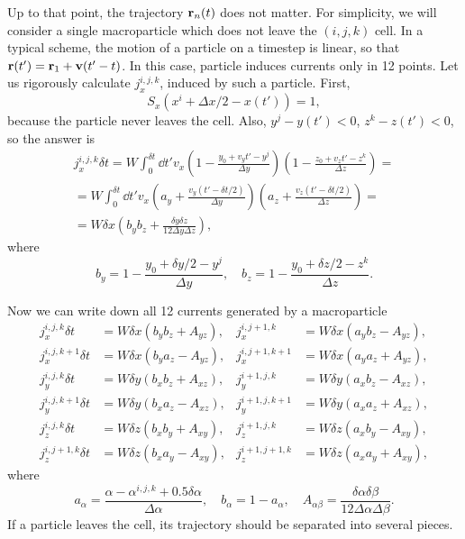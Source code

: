 \documentclass[12pt,a4paper,DIV=calc]{scrartcl}
\begin{document}
Up to that point, the trajectory $\vb{r}_n(t)$ does not matter.
For simplicity, we will consider a single macroparticle which does not leave the $(i,j,k)$ cell.
In a typical scheme, the motion of a particle on a timestep is linear, so that $\vb{r}(t') = \vb{r}_1 + \vb{v} (t'-t)$.
In this case, particle induces currents only in 12 points.
Let us rigorously calculate $j_x^{i,j,k}$, induced by such a particle.
First, 
\begin{equation}
    S_x(x^i + \Delta x/2 - x(t')) = 1,
\end{equation}
because the particle never leaves the cell.
Also, $y^j - y(t') < 0$, $z^k - z(t') < 0$, so the answer is
\begin{multline}
    j_x^{i,j,k} \delta t = W \int_0^{\delta t} \dd{t'} v_x \left(1 - \frac{y_0+v_y t' - y^j}{\Delta y}\right)\left(1 - \frac{z_0+v_z t' - z^k}{\Delta z}\right) = \\
    = W \int_0^{\delta t}\dd{t'} v_x \left(a_y + \frac{v_y (t'-\delta t/2)}{\Delta y}\right)\left(a_z + \frac{v_z (t'-\delta t/2)}{\Delta z}\right) = \\
    = W \delta x \left( b_y b_z + \frac{\delta y\delta z}{12\Delta y \Delta z}\right),
\end{multline}
where 
\begin{equation}
    b_y = 1 - \frac{y_0 + \delta y / 2 - y^j}{\Delta y},\quad b_z = 1 - \frac{y_0 + \delta z / 2 - z^k}{\Delta z}.
\end{equation}

Now we can write down all 12 currents generated by a macroparticle
\begin{equation}
\begin{aligned}
    j_x^{i,j,k} \delta t &= W \delta x (b_y b_z + A_{yz}), & j_x^{i,j+1,k} &= W \delta x (a_y b_z - A_{yz}),\\
    j_x^{i,j,k+1} \delta t &= W \delta x(b_y a_z - A_{yz}), & j_x^{i,j+1,k+1} &= W \delta x(a_y a_z + A_{yz}),\\
    j_y^{i,j,k} \delta t &= W \delta y (b_x b_z + A_{xz}), & j_y^{i+1,j,k} &= W \delta y (a_x b_z - A_{xz}),\\
    j_y^{i,j,k+1} \delta t &= W \delta y (b_x a_z - A_{xz}), & j_y^{i+1,j,k+1} &= W \delta y (a_x a_z + A_{xz}),\\
    j_z^{i,j,k} \delta t &= W \delta z (b_x b_y + A_{xy}), & j_z^{i+1,j,k} &= W \delta z (a_x b_y - A_{xy}),\\
    j_z^{i,j+1,k} \delta t &= W \delta z(b_x a_y - A_{xy}), & j_z^{i+1,j+1,k} &= W \delta z(a_x a_y + A_{xy}),
\end{aligned}
\end{equation}
where
\begin{equation}
    a_\alpha = \frac{\alpha - \alpha^{i,j,k} + 0.5 \delta \alpha}{\Delta \alpha},
    \quad b_\alpha = 1 - a_\alpha,
    \quad A_{\alpha \beta} = \frac{\delta\alpha \delta\beta}{12\Delta\alpha\Delta\beta}.
\end{equation}
If a particle leaves the cell, its trajectory should be separated into several pieces.
\end{document}
